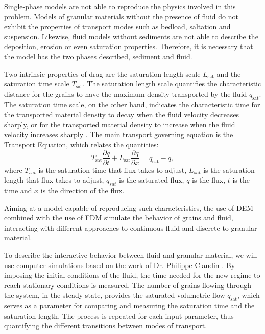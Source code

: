     Single-phase models are not able to reproduce the physics involved in this problem. Models of granular materials without the presence of fluid do not exhibit the properties of transport modes such as bedload, saltation and suspension. Likewise, fluid models without sediments are not able to describe the deposition, erosion or even saturation properties. Therefore, it is necessary that the model has the two phases described, sediment and fluid. 

    Two intrinsic properties of drag are the saturation length scale $L_\textrm{sat}$ and the saturation time scale $T_\textrm{sat}$. The saturation length scale quantifies the characteristic distance for the grains to have the maximum density transported by the fluid $q_\textrm{sat}$. The saturation time scale, on the other hand, indicates the characteristic time for the transported material density to decay when the fluid velocity decreases sharply, or for the transported material density to increase when the fluid velocity increases sharply \cite{Granular_Media_Between_Fluid_and_Solid}. The main transport governing equation is the Transport Equation, which relates the quantities:
\begin{equation}
    T_\textrm{sat} \frac{\partial q}{\partial t} + L_\textrm{sat} \frac{\partial q}{\partial x} = q_\textrm{sat} - q,
    \label{equ:transporte}
\end{equation}
where $T_{sat}$ is the saturation time that flux takes to adjust, $L_{sat}$ is the saturation length that flux takes to adjust, $q_{sat}$ is the saturated flux, $q$ is the flux, $t$ is the time and $x$ is the direction of the flux.

    Aiming at a model capable of reproducing such characteristics, the use of DEM combined with the use of FDM simulate the behavior of grains and fluid, interacting with different approaches to continuous fluid and discrete to granular material. 

    To describe the interactive behavior between fluid and granular material, we will use computer simulations based on the work of Dr. Philippe Claudin \cite{Numerical_simulation_of_turbulent_sediment_transport, Sand_ripples_and_dunes, Direct_numerical_simulations_of_aeolian_sand_ripples}. By imposing the initial conditions of the fluid, the time needed for the new regime to reach stationary conditions is measured. The number of grains flowing through the system, in the steady state, provides the saturated volumetric flow $q_\textrm{sat}$, which serves as a parameter for comparing and measuring the saturation time and the saturation length. The process is repeated for each input parameter, thus quantifying the different transitions between modes of transport.

